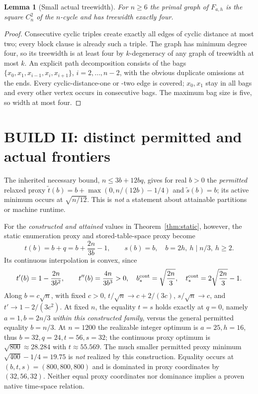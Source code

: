 \documentclass[10pt]{article}
\newtheorem{lemma}[theorem]{Lemma}
\begin{document}
\begin{lemma}[Small actual treewidth]\label{lem:tw}
For $n\ge6$ the primal graph of $F_{a,h}$ is the square $C_n^2$ of the $n$-cycle and has treewidth exactly four.
\end{lemma}
\begin{proof}
Consecutive cyclic triples create exactly all edges of cyclic distance at most two; every block clause is already such a triple. The graph has minimum degree four, so its treewidth is at least four by $k$-degeneracy of any graph of treewidth at most $k$. An explicit path decomposition consists of the bags $\{x_0,x_1,x_{i-1},x_i,x_{i+1}\}$, $i=2,\ldots,n-2$, with the obvious duplicate omissions at the ends. Every cyclic-distance-one or -two edge is covered; $x_0,x_1$ stay in all bags and every other vertex occurs in consecutive bags. The maximum bag size is five, so width at most four.
\end{proof}

\section{BUILD II: distinct permitted and actual frontiers}
The inherited necessary bound, $n\le3b+12bq$, gives for real $b>0$ the \emph{permitted} relaxed proxy $\tilde t(b)=b+\max(0,n/(12b)-1/4)$ and $\tilde s(b)=b$; its active minimum occurs at $\sqrt{n/12}$. This is \emph{not} a statement about attainable partitions or machine runtime.

For the \emph{constructed and attained} values in Theorem~\ref{thm:static}, however, the static enumeration proxy and stored-table-space proxy become
\begin{equation}\label{eq:curve}
 t(b)=b+q=b+\frac{2n}{3b}-1,\qquad s(b)=b,
 \quad b=2h,\ h\mid n/3,\ h\ge2. 
\end{equation}
Its continuous interpolation is convex, since
\[
 t'(b)=1-\frac{2n}{3b^2},\qquad t''(b)=\frac{4n}{3b^3}>0,
 \quad b_*^{\rm cont}=\sqrt{\frac{2n}{3}},\quad
 t_*^{\rm cont}=2\sqrt{\frac{2n}{3}}-1.
\]
Along $b=c\sqrt n$, with fixed $c>0$, $t/\sqrt n\to c+2/(3c)$, $s/\sqrt n\to c$, and $t'\to1-2/(3c^2)$. At fixed $n$, the equality $t=s$ holds exactly at $q=0$, namely $a=1,b=2n/3$ \emph{within this constructed family}, versus the general permitted equality $b=n/3$. At $n=1200$ the realizable integer optimum is $a=25,h=16$, thus $b=32,q=24,t=56,s=32$; the continuous proxy optimum is $\sqrt{800}\approx28.284$ with $t\approx55.569$. The much smaller permitted proxy minimum $\sqrt{400}-1/4=19.75$ is \emph{not} realized by this construction. Equality occurs at $(b,t,s)=(800,800,800)$ and is dominated in proxy coordinates by $(32,56,32)$. Neither equal proxy coordinates nor dominance implies a proven native time-space relation.
\end{document}
